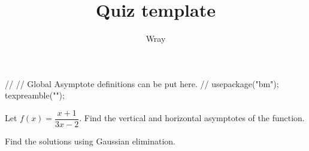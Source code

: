 \documentclass[addpoints, 12pt]{exam}
\title{Quiz template}
\author{Wray}
\begin{document}
\begin{asydef}
//
// Global Asymptote definitions can be put here.
//
usepackage("bm");
texpreamble("\def\V#1{\bm{#1}}");
\end{asydef}



\bigskip

             
\bigskip
\bigskip

\smallskip

\begin{questions}

\question[10]
Let $f(x) = \dfrac{x+1}{3x-2}$.  Find the vertical and horizontal asymptotes of the function.

\newpage

\question[10]
Find the solutions using Gaussian elimination.

\end{questions}
\end{document}

